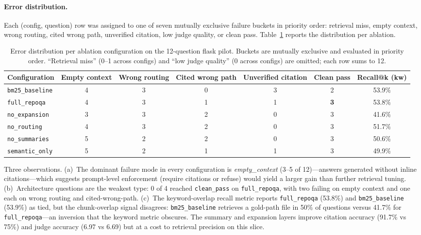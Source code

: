 \documentclass[11pt]{article}
\begin{document}
\paragraph{Error distribution.} Each (config, question) row was assigned to one of seven mutually exclusive failure buckets in priority order: retrieval miss, empty context, wrong routing, cited wrong path, unverified citation, low judge quality, or clean pass. Table~\ref{tab:error-dist} reports the distribution per ablation.

\begin{table}[h]
\centering
\small
\begin{tabular}{lcccccc}
\toprule
\textbf{Configuration} & \textbf{Empty context} & \textbf{Wrong routing} & \textbf{Cited wrong path} & \textbf{Unverified citation} & \textbf{Clean pass} & \textbf{Recall@k (kw)} \\
\midrule
\texttt{bm25\_baseline}  & 4 & 3 & 0 & 3 & 2 & 53.9\% \\
\texttt{full\_repoqa}    & 4 & 3 & 1 & 1 & \textbf{3} & 53.8\% \\
\texttt{no\_expansion}   & 3 & 3 & 2 & 0 & 3 & 41.6\% \\
\texttt{no\_routing}     & 4 & 3 & 2 & 0 & 3 & 51.7\% \\
\texttt{no\_summaries}   & 5 & 2 & 2 & 0 & 3 & 50.6\% \\
\texttt{semantic\_only}  & 5 & 2 & 1 & 1 & 3 & 49.9\% \\
\bottomrule
\end{tabular}
\caption{Error distribution per ablation configuration on the 12-question flask pilot. Buckets are mutually exclusive and evaluated in priority order. ``Retrieval miss'' (0--1 across configs) and ``low judge quality'' (0 across configs) are omitted; each row sums to 12.}
\label{tab:error-dist}
\end{table}

Three observations. (a)~The dominant failure mode in every configuration is \emph{empty\_context} (3--5 of 12)---answers generated without inline citations---which suggests prompt-level enforcement (require citations or refuse) would yield a larger gain than further retrieval tuning. (b)~Architecture questions are the weakest type: 0 of 4 reached \texttt{clean\_pass} on \texttt{full\_repoqa}, with two failing on empty context and one each on wrong routing and cited-wrong-path. (c)~The keyword-overlap recall metric reports \texttt{full\_repoqa} (53.8\%) and \texttt{bm25\_baseline} (53.9\%) as tied, but the chunk-overlap signal disagrees: \texttt{bm25\_baseline} retrieves a gold-path file in 50\% of questions versus 41.7\% for \texttt{full\_repoqa}---an inversion that the keyword metric obscures. The summary and expansion layers improve citation accuracy (91.7\% vs 75\%) and judge accuracy (6.97 vs 6.69) but at a cost to retrieval precision on this slice.
\end{document}
